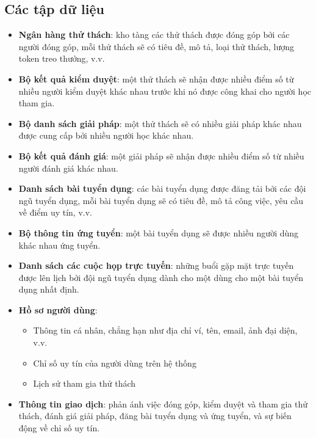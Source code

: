 \subsection{Các tập dữ liệu}
\begin{itemize}
  \item \textbf{Ngân hàng thử thách}: kho tàng các thử thách được đóng góp bởi các người đóng góp, mỗi thử thách sẽ có tiêu đề, mô tả, loại thử thách, lượng token treo thưởng, v.v.
  \item \textbf{Bộ kết quả kiểm duyệt}: một thử thách sẽ nhận được nhiều điểm số từ nhiều người kiểm duyệt khác nhau trước khi nó được công khai cho người học tham gia.
  \item \textbf{Bộ danh sách giải pháp}: một thử thách sẽ có nhiều giải pháp khác nhau được cung cấp bởi nhiều người học khác nhau.
  \item \textbf{Bộ kết quả đánh giá}: một giải pháp sẽ nhận được nhiều điểm số từ nhiều người đánh giá khác nhau.
  \item \textbf{Danh sách bài tuyển dụng}: các bài tuyển dụng được đăng tải bởi các đội ngũ tuyển dụng, mỗi bài tuyển dụng sẽ có tiêu đề, mô tả công việc, yêu cầu về điểm uy tín, v.v.
  \item \textbf{Bộ thông tin ứng tuyển}: một bài tuyển dụng sẽ được nhiều người dùng khác nhau ứng tuyển.
  \item \textbf{Danh sách các cuộc họp trực tuyến}: những buổi gặp mặt trực tuyến được lên lịch bởi đội ngũ tuyển dụng dành cho một dùng cho một bài tuyển dụng nhất định.
  \item \textbf{Hồ sơ người dùng}:
  \begin{itemize}
    \item Thông tin cá nhân, chẳng hạn như địa chỉ ví, tên, email, ảnh đại diện, v.v.
    \item Chỉ số uy tín của người dùng trên hệ thống
    \item Lịch sử tham gia thử thách
  \end{itemize}
  \item \textbf{Thông tin giao dịch}: phản ánh việc đóng góp, kiểm duyệt và tham gia thử thách, đánh giá giải pháp, đăng bài tuyển dụng và ứng tuyển, và sự biến động về chỉ số uy tín.
\end{itemize}

